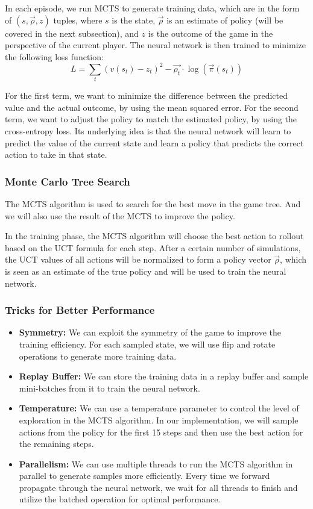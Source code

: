 \documentclass[conference]{IEEEtran}
\begin{document}
In each episode, we run MCTS to generate training data, which are in the form of $(s, \vec{\rho}, z)$ tuples, where $s$ is the state, $\vec{\rho}$ is an estimate of policy (will be covered in the next subsection), and $z$ is the outcome of the game in the perspective of the current player.
The neural network is then trained to minimize the following loss function:
\begin{equation}
    L = \sum_t (v(s_t) - z_t)^2 - \vec{\rho_t} \cdot \log(\vec{\pi}(s_t))
\end{equation}

For the first term, we want to minimize the difference between the predicted value and the actual outcome, by using the mean squared error.
For the second term, we want to adjust the policy to match the estimated policy, by using the cross-entropy loss.
Its underlying idea is that the neural network will learn to predict the value of the current state and learn a policy that predicts the correct action to take in that state.

\subsubsection{Monte Carlo Tree Search}

The MCTS algorithm is used to search for the best move in the game tree.
And we will also use the result of the MCTS to improve the policy.

In the training phase, the MCTS algorithm will choose the best action to rollout based on the UCT formula for each step.
After a certain number of simulations, the UCT values of all actions will be normalized to form a policy vector $\vec{\rho}$, which is seen as an estimate of the true policy and will be used to train the neural network.

\subsubsection{Tricks for Better Performance}

\begin{itemize}
    \item \textbf{Symmetry:} We can exploit the symmetry of the game to improve the training efficiency. For each sampled state, we will use flip and rotate operations to generate more training data.
    \item \textbf{Replay Buffer:} We can store the training data in a replay buffer and sample mini-batches from it to train the neural network.
    \item \textbf{Temperature:} We can use a temperature parameter to control the level of exploration in the MCTS algorithm. In our implementation, we will sample actions from the policy for the first 15 steps and then use the best action for the remaining steps.
    \item \textbf{Parallelism:} We can use multiple threads to run the MCTS algorithm in parallel to generate samples more efficiently. Every time we forward propagate through the neural network, we wait for all threads to finish and utilize the batched operation for optimal performance.
\end{itemize}
\end{document}

